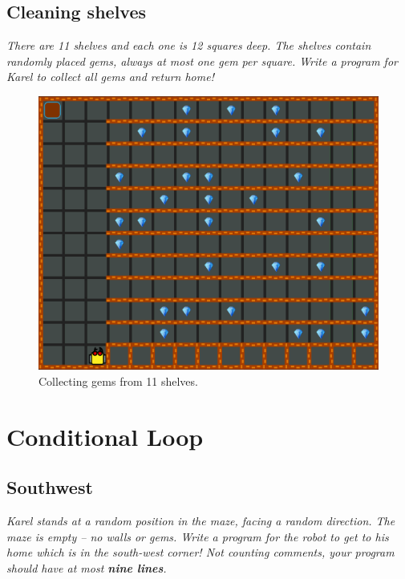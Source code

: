 {{\subsection{Cleaning shelves}

{\em There are 11 shelves and each one is 12 squares deep. The shelves contain randomly placed gems, always at most one gem per square. Write a program for Karel to collect all gems and return home!}

\newpage

\vspace{-5mm}
\begin{figure}[!ht]
\begin{center}
\includegraphics[height=0.4\textwidth]{img/d04.png}
\end{center}
\vspace{-4mm}
\caption{Collecting gems from 11 shelves.}
\label{fig:d04}
\vspace{-4mm}
\end{figure}


\section{Conditional Loop}

\subsection{Southwest}

{\em Karel stands at a random position in the maze, facing a random direction. The maze is empty -- no walls or gems. Write a program for the robot to get to his home which is in the south-west corner! Not counting comments, your program should have 
at most {\bf nine lines}.}

}}
